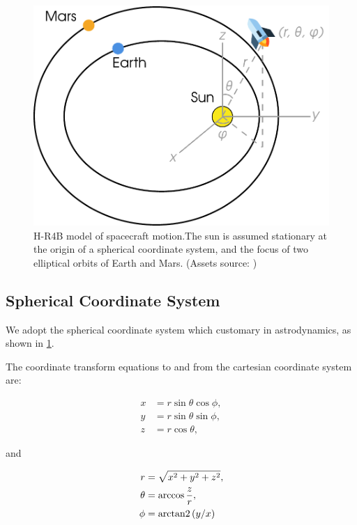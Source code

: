 \begin{figure}[ht]
    \centering
    \includegraphics[width=0.80\linewidth]{fig/solar-system-model}
    \caption{ H-R4B model of spacecraft motion.The sun is assumed stationary at the origin of a spherical coordinate system, and the focus of two elliptical orbits of Earth and Mars. (Assets source: \cite{WikiSpherical,flaticon})}
    \label{fig:solar-system-model}
\end{figure}

\subsection{Spherical Coordinate System}
We adopt the spherical coordinate system which customary in astrodynamics, as shown in \cref{fig:solar-system-model}.

The coordinate transform equations to and from the cartesian coordinate system are:

\begin{align}
    x &= r \sin{\theta}\cos{\phi}, \label{eq:x(q)} \\
    y &= r \sin{\theta}\sin{\phi}, \label{eq:y(q)}\\
    z &= r \cos{\theta}, \label{eq:z(q)}
\end{align}

and

\begin{align}
    r &= \sqrt{x^2 + y^2 + z^2}, \label{eq:r(x,y,z)}\\
    \theta &= \arccos{\frac{z}{r}}, \label{eq:theta(x,y,z)}\\
    \phi &= 
    \operatorname{arctan2}{(y/x)} \\
    \label{eq:phi(x,y,z)}
\end{align}

